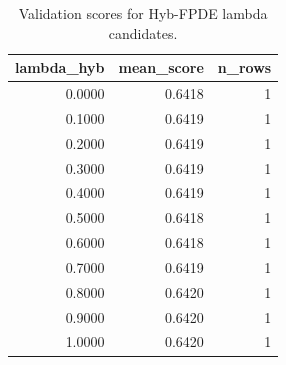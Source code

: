 \begin{table}[t]
\caption{Validation scores for Hyb-FPDE lambda candidates.}
\label{tab:lambda_distribution_computed}
\centering
\begin{tabular}{rrr}
\toprule
lambda\_hyb & mean\_score & n\_rows \\
\midrule
0.0000 & 0.6418 & 1 \\
0.1000 & 0.6419 & 1 \\
0.2000 & 0.6419 & 1 \\
0.3000 & 0.6419 & 1 \\
0.4000 & 0.6419 & 1 \\
0.5000 & 0.6418 & 1 \\
0.6000 & 0.6418 & 1 \\
0.7000 & 0.6419 & 1 \\
0.8000 & 0.6420 & 1 \\
0.9000 & 0.6420 & 1 \\
1.0000 & 0.6420 & 1 \\
\bottomrule
\end{tabular}

\end{table}

